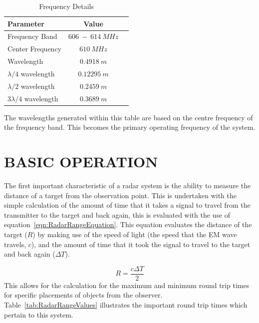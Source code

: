 \documentclass[11pt]{witseiepaper}
\begin{document}
\begin{bibunit}[witseie]
\begin{table}
    \caption{Frequency Details}
    \label{tab:FrequencyDetails}
    \begin{center}
        \begin{tabular}{p{70mm}cp{70mm}}
            \hline 
            Parameter & Value \\
            \hline
            Frequency Band & $606~-~614~MHz$ \\
            Center Frequency & $610~MHz$ \\
            Wavelength & $0.4918~m$ \\
            $\lambda /4$ wavelength & $0.12295~m$ \\
            $\lambda /2$ wavelength & $0.2459~m$ \\
            $3 \lambda /4$ wavelength & $0.3689~m$ \\                
        \end{tabular}
    \end{center}
\end{table}
The wavelengths generated within this table are based on the centre frequency of the frequency band. This becomes the primary operating frequency of the system.



\section{BASIC OPERATION} \label{sec:BasicOperation}
The first important characteristic of a radar system is the ability to measure the distance of a target from the observation point. This is undertaken with the simple calculation of the amount of time that it takes a signal to travel from the transmitter to the target and back again, this is evaluated with the use of equation~\ref{eqn:RadarRangeEquation}. This equation evaluates the distance of the target ($R$) by making use of the speed of light (the speed that the EM wave travels, $c$), and the amount of time that it took the signal to travel to the target and back again ($\Delta T$).

\begin{equation} \label{eqn:RadarRangeEquation}
    R = \frac{c \Delta T}{2}
\end{equation}
This allows for the calculation for the maximum and minimum round trip times for specific placements of objects from the observer. Table~\ref{tab:RadarRangeValues} illustrates the important round trip times which pertain to this system.


\end{bibunit}
\end{document}
